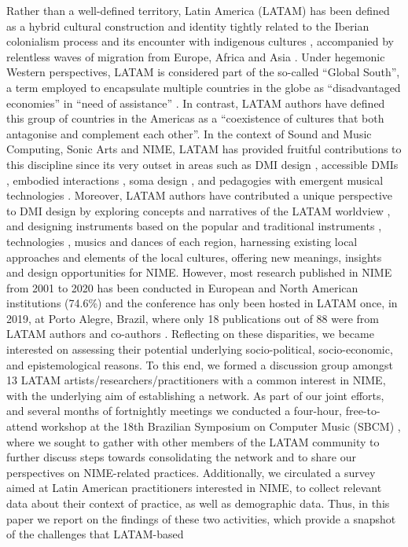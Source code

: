 \documentclass[sigconf]{nimeart}
\begin{document}
Rather than a well-defined territory, Latin America (LATAM) has been defined as a hybrid cultural construction and identity \cite{alvarado2020fostering} tightly related to the Iberian colonialism process and its encounter with indigenous cultures \cite{10.1145U002F3447794}, accompanied by relentless waves of migration from Europe, Africa and Asia \cite{moya2018migration}. Under hegemonic Western perspectives, LATAM is considered part of the so-called ``Global South'', a term employed to encapsulate multiple countries in the globe as ``disadvantaged economies'' \cite{wong2020reflections} in ``need of assistance'' \cite{tragtenberg2021gambiarra}. In contrast, LATAM authors have defined this group of countries in the Americas as a ``coexistence of cultures that both antagonise and complement each other''\cite{rivera2010ch}. In the context of Sound and Music Computing, Sonic Arts and NIME, LATAM has provided fruitful contributions to this discipline since its very outset \cite{lerner2019latin,sbcm} in areas such as DMI design \cite{avila2019encumbered,c10,calegario2017method,lerner2017osiris,pardue2020vodhran,ramos2019eolos,rodger2020makes,Dannemann1}, accessible DMIs \cite{c17,lucas2019bespoke}, embodied interactions \cite{c19,jaimovich2019shaping}, soma design \cite{diaz2019conceptual,avila2020soma}, and pedagogies with emergent musical technologies \cite{corintha2019amigo,corintha2021improvised,c25,marquez2020collaborative}. Moreover, LATAM authors have contributed a unique perspective to DMI design by exploring concepts and narratives of the LATAM worldview \cite{alarcon2019intimal,alarcon2019sensing}, and designing instruments based on the popular \cite{c29} and traditional instruments \cite{c30}, technologies \cite{c31,c32}, musics and dances \cite{c33} of each region, harnessing existing local approaches \cite{NIME21_75} \textbf{} and elements of the local cultures, offering new meanings, insights and design opportunities for NIME. However, most research published in NIME from 2001 to 2020 has been conducted in European and North American institutions (74.6\%) \cite{fasciani202120} and the conference has only been hosted in LATAM once, in 2019, at Porto Alegre, Brazil, where only 18 publications out of 88 were from LATAM authors and co-authors \cite{NIME20_83}. Reflecting on these disparities, we became interested on assessing their potential underlying socio-political, socio-economic, and epistemological reasons. To this end, we formed a discussion group amongst 13 LATAM artists/researchers/practitioners with a common interest in NIME, with the underlying aim of establishing a network. As part of our joint efforts, and several months of fortnightly meetings we conducted a four-hour, free-to-attend workshop at the 18th Brazilian Symposium on Computer Music (SBCM) \cite{sbcm}, where we sought to gather with other members of the LATAM community to further discuss steps towards consolidating the network and to share our perspectives on NIME-related practices. Additionally, we circulated a survey aimed at Latin American practitioners interested in NIME, to collect relevant data about their context of practice, as well as demographic data. Thus, in this paper we report on the findings of these two activities, which provide a snapshot of the challenges that LATAM-based 
\end{document}
